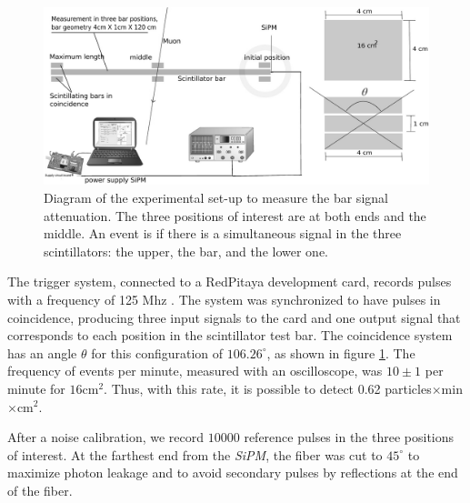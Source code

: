 \documentclass[submitting]{nst}
\begin{document}
\begin{figure}[h!] %
    \centering
        \includegraphics[scale=0.23]{Figures/barras_coincidencia.png}
   \caption{Diagram of the experimental set-up to measure the bar signal attenuation. The three positions of interest are at both ends and the middle. An event is if there is a simultaneous signal in the three scintillators: the upper, the bar, and the lower one.} 
   \label{coincidencia_barras}
\end{figure}

The trigger system, connected to a RedPitaya development card, records pulses with a frequency of 125 Mhz \cite{Pitaya2016}. The system was synchronized to have pulses in coincidence, producing three input signals to the card and one output signal that corresponds to each position in the scintillator test bar. The coincidence system has an angle $\theta$ for this configuration of $106.26^{\circ}$, as shown in figure \ref{coincidencia_barras}. The frequency of events per minute, measured with an oscilloscope, was $10\pm1$ per minute for $16$cm$^2$. Thus, with this rate, it is possible to detect 0.62 particles$\times$min$\times$cm$^2$. 

After a noise calibration, we record $10000$ reference pulses in the three positions of interest. At the farthest end from the \textsl{SiPM}, the fiber was cut to $45^{\circ}$ to maximize photon leakage and to avoid secondary pulses by reflections at the end of the fiber. 
\end{document}
